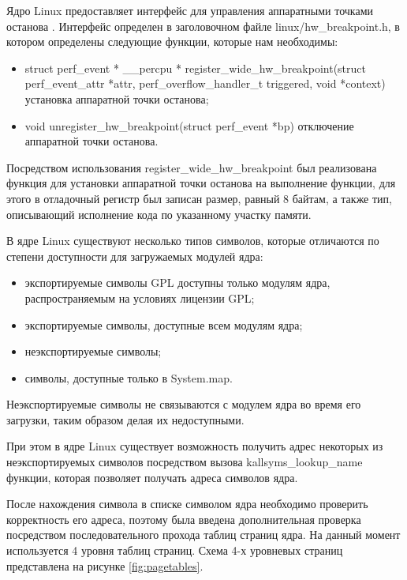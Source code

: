 \documentclass{gost7.32-2001}
\begin{document}
Ядро Linux предоставляет интерфейс для управления аппаратными точками
останова . Интерфейс определен в заголовочном
файле linux/hw\_breakpoint.h, в котором определены следующие функции,
которые нам необходимы:
\begin{itemize}
\item
   struct perf\_event * \_\_percpu *
   register\_wide\_hw\_breakpoint(struct perf\_event\_attr *attr,
   perf\_overflow\_handler\_t triggered,
   void *context) \dash установка аппаратной точки останова;
 \item
   void unregister\_hw\_breakpoint(struct perf\_event *bp) \dash
   отключение аппаратной точки останова.
\end{itemize}

Посредством использования register\_wide\_hw\_breakpoint был
реализована функция для установки аппаратной точки останова на
выполнение функции, для этого в отладочный регистр был записан размер,
равный 8 байтам, а также тип, описывающий исполнение кода по
указанному участку памяти.

В ядре Linux существуют несколько типов символов, которые отличаются
по степени доступности для загружаемых модулей ядра:
\begin{itemize}
\item
  экспортируемые символы GPL \dash доступны только модулям ядра,
  распространяемым на условиях лицензии GPL;
\item
  экспортируемые символы, доступные всем модулям ядра;
\item
  неэкспортируемые символы;
\item
  символы, доступные только в System.map.
\end{itemize}

Неэкспортируемые символы не связываются с модулем ядра во время его
загрузки, таким образом делая их недоступными.

При этом в ядре Linux существует возможность получить адрес некоторых
из неэкспортируемых символов посредством вызова
kallsyms\_lookup\_name \dash функции, которая позволяет получать
адреса символов ядра.

После нахождения символа в списке символом ядра необходимо проверить
корректность его адреса, поэтому была введена дополнительная проверка
посредством последовательного прохода таблиц страниц ядра. На данный
момент используется 4 уровня таблиц страниц. Схема 4-х
уровневых страниц представлена на рисунке \ref{fig:pagetables}.

\end{document}
